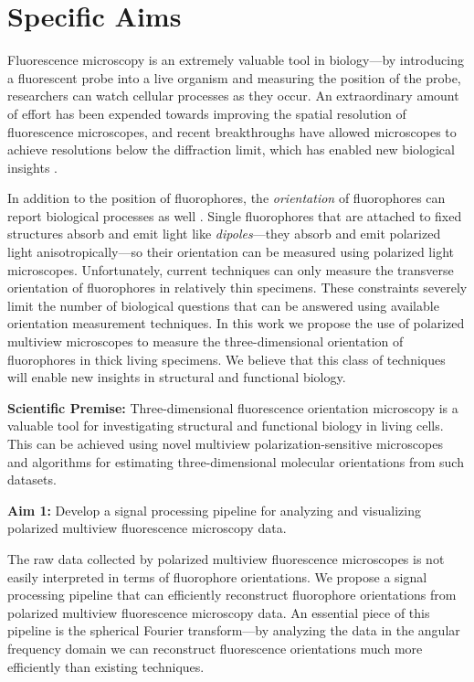 \documentclass[11pt]{article}
\begin{document}
\section*{Specific Aims}
Fluorescence microscopy is an extremely valuable tool in biology---by
introducing a fluorescent probe into a live organism and measuring the position
of the probe, researchers can watch cellular processes as they occur. An
extraordinary amount of effort has been expended towards improving the spatial
resolution of fluorescence microscopes, and recent breakthroughs have allowed
microscopes to achieve resolutions below the diffraction limit, which has
enabled new biological insights \cite{nobel}.

In addition to the position of fluorophores, the \textit{orientation} of
fluorophores can report biological processes as well \cite{weiss1999}. Single
fluorophores that are attached to fixed structures absorb and emit light like
\textit{dipoles}---they absorb and emit polarized light anisotropically---so
their orientation can be measured using polarized light
microscopes. Unfortunately, current techniques can only measure the transverse
orientation of fluorophores in relatively thin specimens. These constraints
severely limit the number of biological questions that can be answered using
available orientation measurement techniques. In this work we propose the use of
polarized multiview microscopes to measure the three-dimensional orientation of
fluorophores in thick living specimens. We believe that this class of techniques
will enable new insights in structural and functional biology.

\noindent\textbf{Scientific Premise:} Three-dimensional fluorescence orientation
microscopy is a valuable tool for investigating structural and functional
biology in living cells. This can be achieved using novel multiview
polarization-sensitive microscopes and algorithms for estimating
three-dimensional molecular orientations from such datasets.

\noindent\textbf{Aim 1:} Develop a signal processing pipeline for analyzing and visualizing polarized multiview fluorescence microscopy data.

The raw data collected by polarized multiview fluorescence microscopes is not
easily interpreted in terms of fluorophore orientations. We propose a signal
processing pipeline that can efficiently reconstruct fluorophore orientations
from polarized multiview fluorescence microscopy data. An essential piece of
this pipeline is the spherical Fourier transform---by analyzing the data in the
angular frequency domain we can reconstruct fluorescence orientations much more
efficiently than existing techniques.
\end{document}
